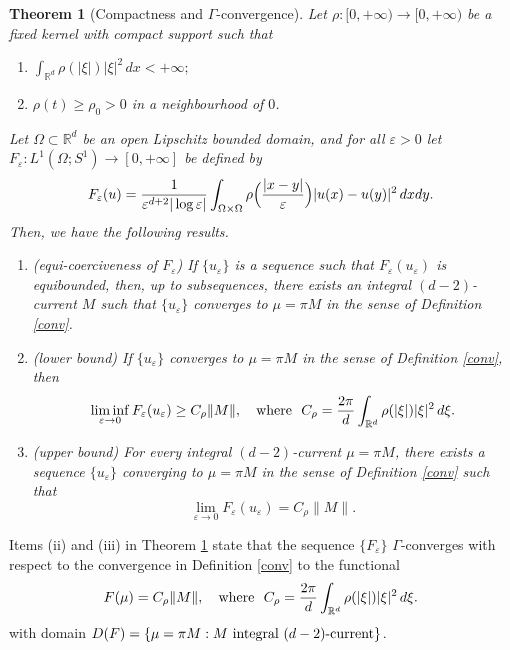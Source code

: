 \documentclass[11pt]{article}
\newtheorem{theorem}[definition]{Theorem}
\def\e{\varepsilon}
\def\dxy{\,dx dy}
\begin{document}
\begin{theorem}[Compactness and $\Gamma$-convergence]\label{comp-convergence}
Let $\rho\colon[0,+\infty)\to[0,+\infty)$ be a fixed kernel with compact support such that 
\begin{enumerate}
    \item[\rm(a)] $\displaystyle\int_{\mathbb R^d}\rho(|\xi|)|\xi|^2\, dx<+\infty;$
    \item[\rm(b)] $\rho(t)\geq \rho_0 >0$ in a neighbourhood of $0$. 
\end{enumerate} 
Let $\Omega\subset\mathbb R^d$ be an open Lipschitz bounded domain, and for all $\e>0$ let $F_\e\colon L^1(\Omega; S^1)\to [0,+\infty]$ be defined by 
\begin{equation*}
F_\e(u)=
{1\over\e^{d+2}|\log\e|} \int_{\Omega\times\Omega}\rho\Bigl({|x-y|\over\e}\Bigr) {|u(x)-u(y)|^2}\dxy.
\end{equation*}
Then, we have the following results. 
\begin{enumerate}
\item[{\rm (i)}] {\rm (equi-coerciveness of $F_\e$)} 
If $\{u_\e\}$ is a sequence such that 
$F_\e(u_\e)$ is equibounded,  
then, up to subsequences, there exists an integral $(d-2)$-current $M$ 
such that $\{u_\e\}$ converges to $\mu=\pi M$ in the sense of Definition {\rm\ref{conv}}. 
\item[{\rm (ii)}] {\rm (lower bound)} 
If $\{u_\e\}$ converges to $\mu=\pi M$ in the sense of Definition {\rm\ref{conv}}, then 
\begin{equation}\label{Crho}
\liminf_{\e\to 0}F_\e(u_\e)\geq C_\rho \|M\|, \ \ \hbox{ where } \  C_\rho={2\pi\over d}\int_{\mathbb R^d}\rho(|\xi|)|\xi|^2\, d\xi.
\end{equation} 
\item[{\rm (iii)}] {\rm (upper bound)} For every integral $(d-2)$-current $\mu=\pi M$, there exists a sequence $\{u_\e\}$ converging to $\mu=\pi M$ in the sense of Definition {\rm\ref{conv}} such that 
$$\lim_{\e\to 0}F_\e(u_\e)= C_\rho \|M\|.$$
\end{enumerate}
\end{theorem}
 Items (ii) and (iii) in Theorem \ref{comp-convergence} state that the sequence $\{F_\e\}$ $\Gamma$-converges with respect to the convergence in Definition {\rm\ref{conv}} to the functional 
$$F(\mu)= C_\rho \|M\|, \ \ \hbox{ where } \  C_\rho={2\pi\over d}\int_{\mathbb R^d}\rho(|\xi|)|\xi|^2\, d\xi.$$
with domain 
$D(F)=\{\mu=\pi M:  M \ \hbox{\rm integral } (d-2)\hbox{\rm -current}\}$.
\end{document}
